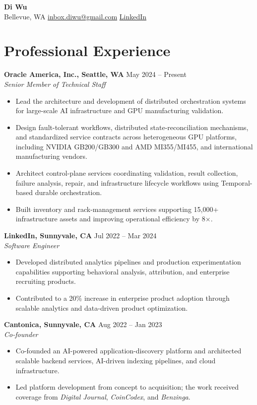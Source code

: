 \documentclass[letterpaper,10pt]{article}
\newcommand{\cventry}[3]{%
  \textbf{#1} \hfill #2\\
  \textit{#3}
}
\begin{document}
\begin{center}
  {\Large\textbf{Di Wu}}\\
  Bellevue, WA \quad
  \href{mailto:inbox.diwu@gmail.com}{inbox.diwu@gmail.com} \quad
  \href{https://www.linkedin.com/in/di-wu-2020/}{LinkedIn}
\end{center}

\section*{Professional Experience}

\cventry{Oracle America, Inc., Seattle, WA}{May 2024 -- Present}{Senior Member of Technical Staff}
\begin{itemize}
  \item Lead the architecture and development of distributed orchestration systems for large-scale AI infrastructure and GPU manufacturing validation.
  \item Design fault-tolerant workflows, distributed state-reconciliation mechanisms, and standardized service contracts across heterogeneous GPU platforms, including NVIDIA GB200/GB300 and AMD MI355/MI455, and international manufacturing vendors.
  \item Architect control-plane services coordinating validation, result collection, failure analysis, repair, and infrastructure lifecycle workflows using Temporal-based durable orchestration.
  \item Built inventory and rack-management services supporting 15,000+ infrastructure assets and improving operational efficiency by 8$\times$.
\end{itemize}

\cventry{LinkedIn, Sunnyvale, CA}{Jul 2022 -- Mar 2024}{Software Engineer}
\begin{itemize}
  \item Developed distributed analytics pipelines and production experimentation capabilities supporting behavioral analysis, attribution, and enterprise recruiting products.
  \item Contributed to a 20\% increase in enterprise product adoption through scalable analytics and data-driven product optimization.
\end{itemize}

\cventry{Cantonica, Sunnyvale, CA}{Aug 2022 -- Jan 2023}{Co-founder}
\begin{itemize}
  \item Co-founded an AI-powered application-discovery platform and architected scalable backend services, AI-driven indexing pipelines, and cloud infrastructure.
  \item Led platform development from concept to acquisition; the work received coverage from \textit{Digital Journal}, \textit{CoinCodex}, and \textit{Benzinga}.
\end{itemize}
\end{document}
